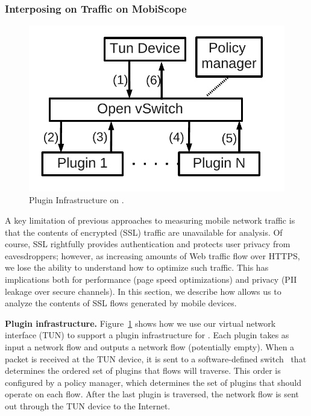 \subsubsection{Interposing on Traffic on MobiScope}
\label{sec:modif-traffic-mobiscope}

\begin{figure}
\begin{center}
\includegraphics[width=0.8\columnwidth]{figures/packet-monitoring-plugin.pdf}
\end{center}
\caption{Plugin Infrastructure on \platname.}
\label{fig:packet-monitoring-solution}
\end{figure}

A key limitation of previous approaches to measuring mobile 
network traffic is that the contents of encrypted (SSL) traffic 
are unavailable for analysis. Of course, SSL rightfully provides 
authentication and protects user privacy from eavesdroppers; 
however, as increasing amounts of Web traffic flow over HTTPS, 
we lose the ability to understand how to optimize such traffic. 
This has implications both for performance (page speed optimizations) 
and privacy (PII leakage over secure channels). In this section, 
we describe how \platname{} allows us to analyze the contents 
of SSL flows generated by mobile devices. 

\noindent\textbf{Plugin infrastructure.} Figure~\ref{fig:packet-monitoring-solution} shows how we use 
our virtual network interface (TUN) to support a plugin
infrastructure for \platname. Each plugin takes as input a 
network flow and outputs a network flow (potentially empty). 
When a packet is received at the TUN
device, it is sent to a software-defined switch~\cite{Openvswitch} that 
determines the ordered set of plugins that flows will traverse. 
This order is configured by a policy manager, which determines 
the set of plugins that should operate on each flow. After the last 
plugin is traversed, the network flow is sent out through the TUN device 
to the Internet. 

